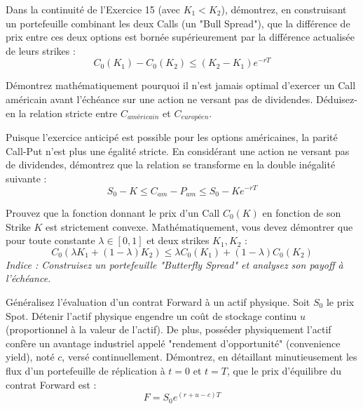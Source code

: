 \begin{exercicebox}
Dans la continuité de l'Exercice 15 (avec $K_1 < K_2$), démontrez, en construisant un portefeuille combinant les deux Calls (un "Bull Spread"), que la différence de prix entre ces deux options est bornée supérieurement par la différence actualisée de leurs strikes :
\begin{equation*}
    C_0(K_1) - C_0(K_2) \leq (K_2 - K_1)e^{-rT}
\end{equation*}
\end{exercicebox}

\begin{exercicebox}
Démontrez mathématiquement pourquoi il n'est jamais optimal d'exercer un Call américain avant l'échéance sur une action ne versant pas de dividendes. Déduisez-en la relation stricte entre $C_{américain}$ et $C_{européen}$.
\end{exercicebox}

\begin{exercicebox}
Puisque l'exercice anticipé est possible pour les options américaines, la parité Call-Put n'est plus une égalité stricte.
En considérant une action ne versant pas de dividendes, démontrez que la relation se transforme en la double inégalité suivante :
\begin{equation*}
    S_0 - K \leq C_{am} - P_{am} \leq S_0 - K e^{-rT}
\end{equation*}
\end{exercicebox}

\begin{exercicebox}
Prouvez que la fonction donnant le prix d'un Call $C_0(K)$ en fonction de son Strike $K$ est strictement convexe.
Mathématiquement, vous devez démontrer que pour toute constante $\lambda \in [0, 1]$ et deux strikes $K_1, K_2$ :
\begin{equation*}
    C_0(\lambda K_1 + (1-\lambda)K_2) \leq \lambda C_0(K_1) + (1-\lambda)C_0(K_2)
\end{equation*}
\textit{Indice : Construisez un portefeuille "Butterfly Spread" et analysez son payoff à l'échéance.}
\end{exercicebox}

\begin{exercicebox}
Généralisez l'évaluation d'un contrat Forward à un actif physique. 
Soit $S_0$ le prix Spot. Détenir l'actif physique engendre un coût de stockage continu $u$ (proportionnel à la valeur de l'actif). De plus, posséder physiquement l'actif confère un avantage industriel appelé "rendement d'opportunité" (convenience yield), noté $c$, versé continuellement.
Démontrez, en détaillant minutieusement les flux d'un portefeuille de réplication à $t=0$ et $t=T$, que le prix d'équilibre du contrat Forward est :
\begin{equation*}
    F = S_0 e^{(r + u - c)T}
\end{equation*}
\end{exercicebox}